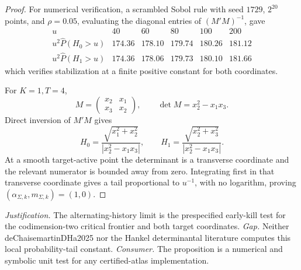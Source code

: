 \documentclass{article}
\begin{document}
\begin{proof}
For numerical verification, a scrambled Sobol rule with seed \(1729\), \(2^{20}\) points, and \(\rho=0.05\), evaluating the diagonal entries of \((M'M)^{-1}\), gave
\[
\begin{array}{c|rrrrr}
u&40&60&80&100&200\\ \hline
u^2\widehat P(H_0>u)&174.36&178.10&179.74&180.26&181.12\\
u^2\widehat P(H_1>u)&174.36&178.06&179.73&180.10&181.66
\end{array}
\]
which verifies stabilization at a finite positive constant for both coordinates.

For \(K=1,T=4\),
\[
M=\begin{pmatrix}x_2&x_1\\x_3&x_2\end{pmatrix},
\qquad \det M=x_2^2-x_1x_3.
\]
Direct inversion of \(M'M\) gives
\[
H_0=\frac{\sqrt{x_1^2+x_2^2}}{|x_2^2-x_1x_3|},
\qquad
H_1=\frac{\sqrt{x_2^2+x_3^2}}{|x_2^2-x_1x_3|}.
\]
At a smooth target-active point the determinant is a transverse coordinate and the relevant numerator is bounded away from zero. Integrating first in that transverse coordinate gives a tail proportional to \(u^{-1}\), with no logarithm, proving \((\alpha_{\Sigma,k},m_{\Sigma,k})=(1,0)\).
\end{proof}
\par\smallskip\noindent \textit{Justification.} The alternating-history limit is the prespecified early-kill test for the codimension-two critical frontier and both target coordinates. \textit{Gap.} Neither deChaisemartinDHa2025 nor the Hankel determinantal literature computes this local probability-tail constant. \textit{Consumer.} The proposition is a numerical and symbolic unit test for any certified-atlas implementation.
\end{document}
